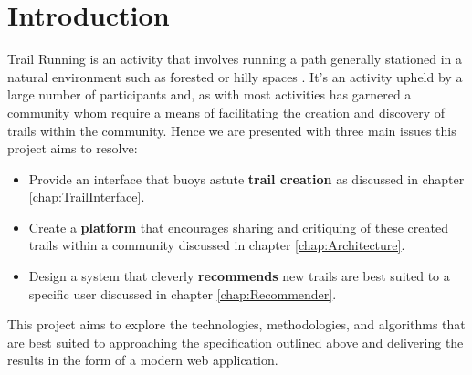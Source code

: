 \chapter{Introduction}
Trail Running is an activity that involves running a path generally stationed in a natural environment such as forested or hilly spaces \cite{wiki:TrailRunning}. It's an activity upheld by a large number of participants and, as with most activities has garnered a community whom require a means of facilitating the creation and discovery of trails within the community. Hence we are presented with three main issues this project aims to resolve:
\begin{itemize}
    \item Provide an interface that buoys astute \textbf{trail creation} as discussed in chapter \ref{chap:TrailInterface}.
    \item Create a \textbf{platform} that encourages sharing and critiquing of these created trails within a community discussed in chapter \ref{chap:Architecture}.
    \item Design a system that cleverly \textbf{recommends} new trails are best suited to a specific user discussed in chapter \ref{chap:Recommender}.
\end{itemize}
This project aims to explore the technologies, methodologies, and algorithms that are best suited to approaching the specification outlined above and delivering the results in the form of a modern web application.

